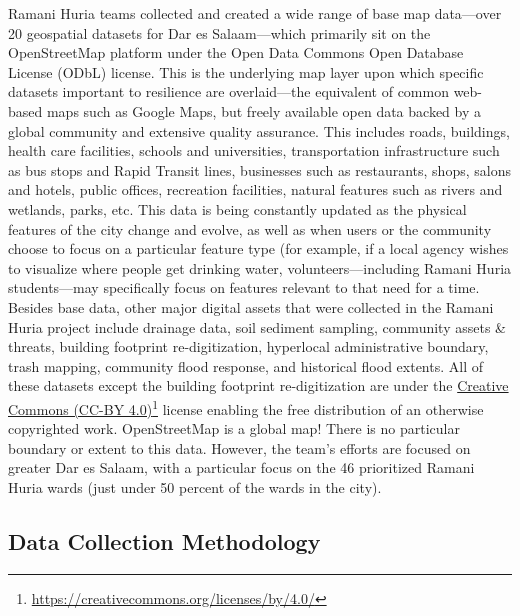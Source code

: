 \documentclass[a4paper,12pt,twoside]{article}
\begin{document}
\begin{multicols}{2}
Ramani Huria teams collected and created a wide range of base map data—over 20 geospatial datasets for Dar es Salaam—which primarily sit on the OpenStreetMap platform under the Open Data Commons Open Database License (ODbL) license. This is the underlying map layer upon which specific datasets important to resilience are overlaid—the equivalent of common web-based maps such as Google Maps, but freely available open data backed by a global community and extensive quality assurance.
This includes roads, buildings, health care facilities, schools and universities, transportation infrastructure such as bus stops and Rapid Transit lines, businesses such as restaurants, shops, salons and hotels, public offices, recreation facilities, natural features such as rivers and wetlands, parks, etc. This data is being constantly updated as the physical features of the city change and evolve, as well as when users or the community choose to focus on a particular feature type (for example, if a local agency wishes to visualize where people get drinking water, volunteers—including Ramani Huria students—may specifically focus on features relevant to that need for a time.
Besides base data, other major digital assets that were collected in the Ramani Huria project include drainage data, soil sediment sampling, community assets & threats, building footprint re-digitization, hyperlocal administrative boundary, trash mapping, community flood response, and historical flood extents. All of these datasets except the building footprint re-digitization are under the \href{https://creativecommons.org/licenses/by/4.0/}{Creative Commons (CC-BY 4.0)}\footnote{\url{https://creativecommons.org/licenses/by/4.0/}} license enabling the free distribution of an otherwise copyrighted work.
OpenStreetMap is a global map! There is no particular boundary or extent to this data. However, the team’s efforts are focused on greater Dar es Salaam, with a particular focus on the 46 prioritized Ramani Huria wards (just under 50 percent of the wards in the city).
\end{multicols}

\newpage
\subsection{Data Collection Methodology}
\end{document}
